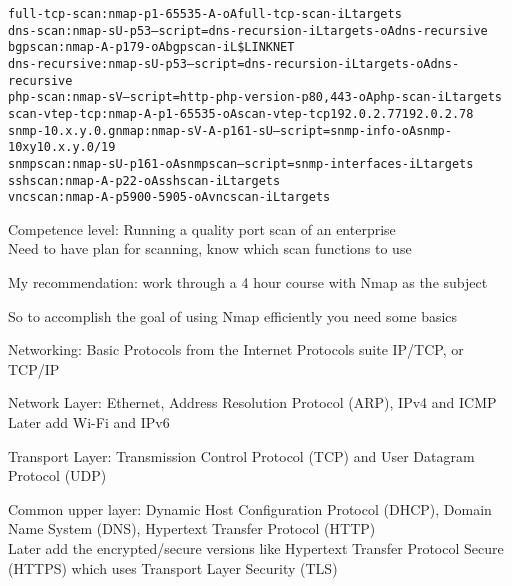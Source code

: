 \documentclass[Screen16to9,17pt]{foils}
\begin{document}

\begin{alltt}\footnotesize
full-tcp-scan: nmap -p 1-65535 -A -oA full-tcp-scan -iL targets
dns-scan: nmap -sU -p 53 --script=dns-recursion -iL targets -oA dns-recursive
bgpscan: nmap -A -p 179 -oA bgpscan -iL \$LINKNET
dns-recursive: nmap -sU -p 53 --script=dns-recursion -iL targets -oA dns-recursive
php-scan: nmap -sV --script=http-php-version -p80,443 -oA php-scan -iL targets
scan-vtep-tcp: nmap -A -p 1-65535 -oA scan-vtep-tcp 192.0.2.77 192.0.2.78
snmp-10.x.y.0.gnmap: nmap -sV -A -p 161 -sU --script=snmp-info -oA snmp-10xy 10.x.y.0/19
snmpscan: nmap -sU -p 161 -oA snmpscan --script=snmp-interfaces -iL targets
sshscan: nmap -A -p 22 -oA sshscan -iL targets
vncscan: nmap -A -p 5900-5905 -oA vncscan -iL targets
\end{alltt}

\begin{list2}
\item Competence level: Running a quality port scan of an enterprise\\
Need to have plan for scanning, know which scan functions to use
\end{list2}

My recommendation: work through a 4 hour course with Nmap as the subject






So to accomplish the goal of using Nmap efficiently you need some basics

Networking: Basic Protocols from the Internet Protocols suite IP/TCP, or TCP/IP
\begin{list2}
\item Network Layer: Ethernet, Address Resolution Protocol (ARP), IPv4 and ICMP\\
Later add Wi-Fi and IPv6
\item Transport Layer: Transmission Control Protocol (TCP) and User Datagram Protocol (UDP)
\item Common upper layer: Dynamic Host Configuration Protocol (DHCP), Domain Name System (DNS),
Hypertext Transfer Protocol (HTTP)\\
Later add the encrypted/secure versions like Hypertext Transfer Protocol Secure (HTTPS) which uses Transport Layer Security (TLS)
\end{list2}
\end{document}
